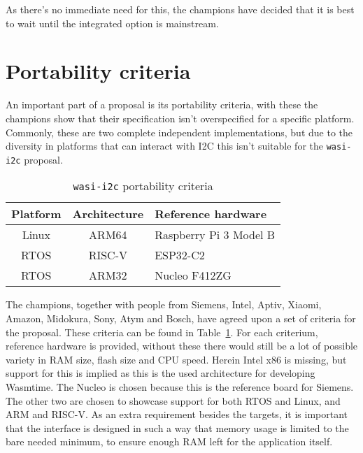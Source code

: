 As there's no immediate need for this, the champions have decided that it is best to wait until the integrated option is mainstream.

\newpage

\section{Portability criteria}

An important part of a proposal is its portability criteria, with these the champions show that their specification isn't overspecified for a specific platform. Commonly, these are two complete independent implementations, but due to the diversity in platforms that can interact with I2C this isn't suitable for the \texttt{wasi-i2c} proposal. 

\begin{table}[h]
	\centering
	\captionsetup{justification=centering}
	\begin{tabular}{c c l}
		\toprule
		Platform & Architecture & Reference hardware \\ \midrule
        Linux    & ARM64 & Raspberry Pi 3 Model B \\
        RTOS    & RISC-V & ESP32-C2 \\
        RTOS      & ARM32 & Nucleo F412ZG \\
		\bottomrule
	\end{tabular}
    \caption{\texttt{wasi-i2c} portability criteria}
	\label{tab:criteria}
\end{table}

The champions, together with people from Siemens, Intel, Aptiv, Xiaomi, Amazon, Midokura, Sony, Atym and Bosch, have agreed upon a set of criteria for the proposal. These criteria can be found in Table~\ref{tab:criteria}. For each criterium, reference hardware is provided, without these there would still be a lot of possible variety in RAM size, flash size and CPU speed. Herein Intel x86 is missing, but support for this is implied as this is the used architecture for developing Wasmtime. The Nucleo is chosen because this is the reference board for Siemens. The other two are chosen to showcase support for both RTOS and Linux, and ARM and RISC-V.
As an extra requirement besides the targets, it is important that the interface is designed in such a way that memory usage is limited to the bare needed minimum, to ensure enough RAM left for the application itself.

